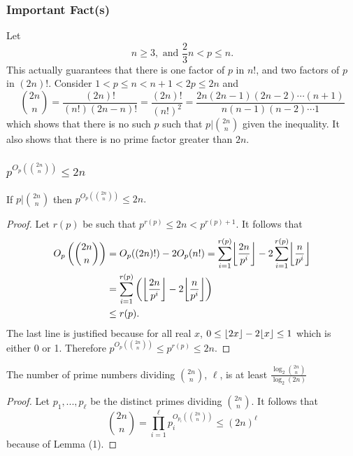 \documentclass{beamer}
\DeclarePairedDelimiter\floor{\lfloor}{\rfloor}
\DeclarePairedDelimiter\bigfloor{\bigg\lfloor}{\bigg\rfloor}
\begin{document}
\begin{frame}
\frametitle{Important Fact(s)}
Let 
$$n \geq 3, \text{ and } \frac{2}{3}n < p \leq n.$$
\pause
This actually guarantees that there is one factor of $p$ in $n!$, and two factors of $p$ in $(2n)!.$ Consider $1 < p \leq n < n +1 < 2p \leq 2n$ and 
$${2n \choose n} = \frac{(2n)!}{(n!)(2n - n)!} = \frac{(2n)!}{(n!)^2}  = \frac{2n(2n-1)(2n-2)\cdots(n+1)}{n(n-1)(n-2)\cdots 1}$$
\pause
which shows that there is no such $p$ such that $p | {2n \choose  n}$ given the inequality. It also shows that there is no prime factor greater than $2n$.
\end{frame}

\begin{frame}
\frametitle{$p^{O_p({2n \choose n})} \leq 2n$}
\begin{lemma}[1]
\normalfont If $p | {2n\choose n}$ then $p^{O_p({2n \choose n})} \leq 2n.$
\end{lemma}
\pause
\begin{proof}
Let $r(p)$ be such that $p^{r(p)} \leq 2n < p^{r(p)+1}$. It follows that
\pause
\vspace{-.4cm}
\begin{align*}
O_p\left({2n \choose n}\right) &= O_p((2n)!) - 2O_p(n!) = \sum_{i=1}^{r(p)}\bigfloor{\frac{2n}{p^i}} - 2\sum_{i=1}^{r(p)}\bigfloor{\frac{n}{p^i}} \\
&= \sum_{i = 1}^{r(p)}\left(\bigfloor{\frac{2n}{p^i}} - 2\bigfloor{\frac{n}{p^i}}\right) \\
&\leq r(p).
\end{align*}
\pause
The last line is justified because for all real $x$, $0 \leq \floor{2x} - 2\floor{x} \leq 1$ which is either 0 or 1. Therefore $p^{O_p\left({2n \choose n}\right)} \leq p^{r(p)} \leq 2n.$
\end{proof}
\end{frame}

\begin{frame}
\begin{corollary}[2]
\normalfont The number of prime numbers dividing ${2n \choose n}$, $\ell$, is at least $\frac{\log_2{2n\choose n}}{\log_2(2n)}$
\end{corollary}
\pause
\begin{proof}
Let $p_1, ..., p_{\ell}$ be the distinct primes dividing ${2n \choose n}.$ It follows that
\pause
$${2n \choose n} = \prod_{i = 1}^{\ell}p_i^{O_{p_i}({2n\choose n})} \leq (2n)^\ell$$
because of Lemma (1).
\end{proof}
\end{frame}
\end{document}
